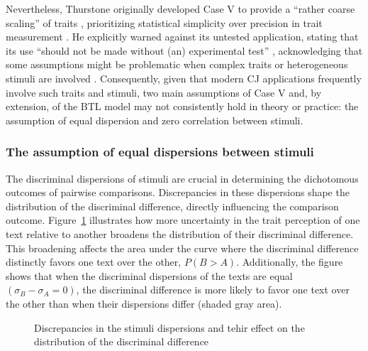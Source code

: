 \documentclass[
  authoryear,
  preprint,
  1p]{elsarticle}
\begin{document}
Nevertheless, Thurstone originally developed Case V to provide a
``rather coarse scaling'' of traits \citep[pp.~269]{Thurstone_1927b},
prioritizing statistical simplicity over precision in trait measurement
\citep[pp.~677]{Kelly_et_al_2022}. He explicitly warned against its
untested application, stating that its use ``should not be made without
(an) experimental test'' \citep[pp.~270]{Thurstone_1927b}, acknowledging
that some assumptions might be problematic when complex traits or
heterogeneous stimuli are involved \citep[pp.~376]{Thurstone_1927a}.
Consequently, given that modern CJ applications frequently involve such
traits and stimuli, two main assumptions of Case V and, by extension, of
the BTL model may not consistently hold in theory or practice: the
assumption of equal dispersion and zero correlation between stimuli.

\subsubsection{The assumption of equal dispersions between
stimuli}\label{sec-theory-issue1a}

The discriminal dispersions of stimuli are crucial in determining the
dichotomous outcomes of pairwise comparisons. Discrepancies in these
dispersions shape the distribution of the discriminal difference,
directly influencing the comparison outcome. Figure~\ref{fig-dispersion}
illustrates how more uncertainty in the trait perception of one text
relative to another broadens the distribution of their discriminal
difference. This broadening affects the area under the curve where the
discriminal difference distinctly favors one text over the other,
\(P(B > A)\). Additionally, the figure shows that when the discriminal
dispersions of the texts are equal \((\sigma_{B}-\sigma_{A}=0)\), the
discriminal difference is more likely to favor one text over the other
than when their dispersions differ (shaded gray area).

\begin{figure}


\caption{\label{fig-dispersion}Discrepancies in the stimuli dispersions
and tehir effect on the distribution of the discriminal difference}

\end{figure}%
\end{document}
